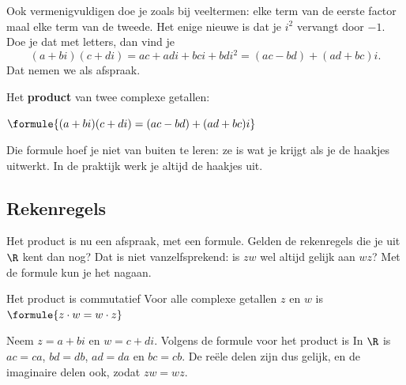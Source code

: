 Ook vermenigvuldigen doe je zoals bij veeltermen: elke term van de eerste factor maal elke term van de tweede. Het enige nieuwe is dat je $i^2$ vervangt door $-1$. Doe je dat met letters, dan vind je
\[ (a + bi)(c + di) = ac + adi + bci + bdi^2 = (ac - bd) + (ad + bc)i . \]
Dat nemen we als afspraak.

\begin{theorie}
Het \textbf{\textcolor{accent}{product}} van twee complexe getallen:

\vspace{1mm}
\qquad $\formule{(a + bi)(c + di) = (ac - bd) + (ad + bc)i}$
\end{theorie}

Die formule hoef je niet van buiten te leren: ze is wat je krijgt als je de haakjes uitwerkt. In de praktijk werk je altijd de haakjes uit.


\subsection{Rekenregels}

Het product is nu een afspraak, met een formule. Gelden de rekenregels die je uit $\R$ kent dan nog? Dat is niet vanzelfsprekend: is $zw$ wel altijd gelijk aan $wz$? Met de formule kun je het nagaan.

\begin{theorie}
\begin{stelling}{Het product is commutatief}
Voor alle complexe getallen $z$ en $w$ is \quad $\formule{z \cdot w = w \cdot z}$
\end{stelling}

\begin{bewijs}
Neem $z = a + bi$ en $w = c + di$. Volgens de formule voor het product is
In $\R$ is $ac = ca$, $bd = db$, $ad = da$ en $bc = cb$. De reële delen zijn dus gelijk, en de imaginaire delen ook, zodat $zw = wz$.
\end{bewijs}
\end{theorie}

